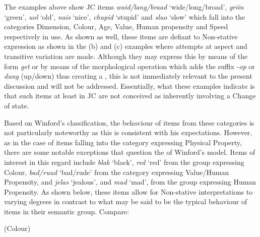\z

The examples  above show JC items \textit{waid\slash lang\slash braad}
`wide\slash long\slash broad', \textit{griin} `green', \textit{uol} `old',
\textit{nais} `nice', \textit{chupid} `stupid' and \textit{sluo} `slow'
which fall into the categories Dimension, Colour, Age, Value, Human
propensity and Speed respectively in  use.  As shown as well,
these items are defiant to Non-stative expression as shown in the (b)
and (c) examples where attempts at  aspect and transitive
variation are made.  Although they may express this by means of the
 form \textit{get} or by means of the morphological
operation which adds the suffix -\textit{op} or \textit{dung}
  (up\slash down) thus creating a , this is not
immediately relevant to the present discussion and will not be
addressed.  Essentially, what these examples indicate is that such
items at least in JC are not conceived as inherently involving a Change of state.

Based on Winford’s classification, the behaviour of items from these
categories is not particularly noteworthy as this is consistent with
his expectations.  However, as in the case of items falling into the
category expressing Physical Property, there are some notable
exceptions that question the  of Winford’s
model.  Items of interest in this regard include \textit{blak}
`black', \textit{red} `red' from the group expressing Colour,
\textit{bad/ruud} `bad\slash rude' from the category expressing Value\slash Human
Propensity, and \textit{jelas} `jealous', and \textit{mad} `mad', from
the group expressing Human Propensity.  As shown below, these items
allow for Non-stative interpretations to varying degrees in contrast
to what may be said to be the typical behaviour of items in their semantic group. 
Compare:

\ea%
\label{ex:3:28}
 (Colour) \\


